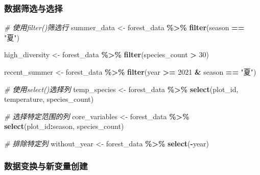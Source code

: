 \documentclass[
]{book}
\newenvironment{Shaded}{\begin{snugshade}}{\end{snugshade}}
\newcommand{\CommentTok}[1]{\textcolor[rgb]{0.56,0.35,0.01}{\textit{#1}}}
\newcommand{\DecValTok}[1]{\textcolor[rgb]{0.00,0.00,0.81}{#1}}
\newcommand{\FunctionTok}[1]{\textcolor[rgb]{0.13,0.29,0.53}{\textbf{#1}}}
\newcommand{\NormalTok}[1]{#1}
\newcommand{\OtherTok}[1]{\textcolor[rgb]{0.56,0.35,0.01}{#1}}
\newcommand{\SpecialCharTok}[1]{\textcolor[rgb]{0.81,0.36,0.00}{\textbf{#1}}}
\newcommand{\StringTok}[1]{\textcolor[rgb]{0.31,0.60,0.02}{#1}}
\begin{document}
\hypertarget{ux6570ux636eux7b5bux9009ux4e0eux9009ux62e9}{%
\subsubsection{数据筛选与选择}\label{ux6570ux636eux7b5bux9009ux4e0eux9009ux62e9}}

\begin{Shaded}
\begin{Highlighting}[]
\CommentTok{\# 使用filter()筛选行}
\NormalTok{summer\_data }\OtherTok{\textless{}{-}}\NormalTok{ forest\_data }\SpecialCharTok{\%\textgreater{}\%}
  \FunctionTok{filter}\NormalTok{(season }\SpecialCharTok{==} \StringTok{"夏"}\NormalTok{)}

\NormalTok{high\_diversity }\OtherTok{\textless{}{-}}\NormalTok{ forest\_data }\SpecialCharTok{\%\textgreater{}\%}
  \FunctionTok{filter}\NormalTok{(species\_count }\SpecialCharTok{\textgreater{}} \DecValTok{30}\NormalTok{)}

\NormalTok{recent\_summer }\OtherTok{\textless{}{-}}\NormalTok{ forest\_data }\SpecialCharTok{\%\textgreater{}\%}
  \FunctionTok{filter}\NormalTok{(year }\SpecialCharTok{\textgreater{}=} \DecValTok{2021} \SpecialCharTok{\&}\NormalTok{ season }\SpecialCharTok{==} \StringTok{"夏"}\NormalTok{)}

\CommentTok{\# 使用select()选择列}
\NormalTok{temp\_species }\OtherTok{\textless{}{-}}\NormalTok{ forest\_data }\SpecialCharTok{\%\textgreater{}\%}
  \FunctionTok{select}\NormalTok{(plot\_id, temperature, species\_count)}

\CommentTok{\# 选择特定范围的列}
\NormalTok{core\_variables }\OtherTok{\textless{}{-}}\NormalTok{ forest\_data }\SpecialCharTok{\%\textgreater{}\%}
  \FunctionTok{select}\NormalTok{(plot\_id}\SpecialCharTok{:}\NormalTok{season, species\_count)}

\CommentTok{\# 排除特定列}
\NormalTok{without\_year }\OtherTok{\textless{}{-}}\NormalTok{ forest\_data }\SpecialCharTok{\%\textgreater{}\%}
  \FunctionTok{select}\NormalTok{(}\SpecialCharTok{{-}}\NormalTok{year)}
\end{Highlighting}
\end{Shaded}

\hypertarget{ux6570ux636eux53d8ux6362ux4e0eux65b0ux53d8ux91cfux521bux5efa}{%
\subsubsection{数据变换与新变量创建}\label{ux6570ux636eux53d8ux6362ux4e0eux65b0ux53d8ux91cfux521bux5efa}}
\end{document}
